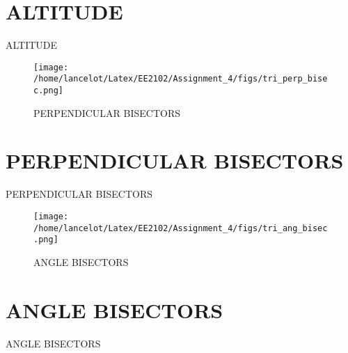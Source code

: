 \documentclass[journal,12pt,onecolumn]{IEEEtran}
\theoremstyle{remark}
\begin{document}
\begin{table}[!ht]
 \section{ALTITUDE}
 \centering
 
 \caption{ALTITUDE}
 \label{table:ALTITUDE}
\end{table}
\begin{figure}[!ht]
  \centering
  \texttt{[image: /home/lancelot/Latex/EE2102/Assignment\_4/figs/tri\_perp\_bisec.png]}
  \caption{PERPENDICULAR BISECTORS}
\end{figure}
\begin{table}[!ht]
 \section{PERPENDICULAR BISECTORS}
 \centering
 
 \caption{PERPENDICULAR BISECTORS}
 \label{table:PERPENDICULAR BISECTORS}
\end{table}
\begin{figure}[!ht]
  \centering
  \texttt{[image: /home/lancelot/Latex/EE2102/Assignment\_4/figs/tri\_ang\_bisec.png]}
  \caption{ANGLE BISECTORS}
  \label{fig33:Triangle_with_centroid}  
\end{figure}
\begin{table}[!ht]
 \section{ANGLE BISECTORS}
 \centering
 
 \caption{ANGLE BISECTORS}
 \label{table:ANGLE BISECTORS}
\end{table}
\end{document}
